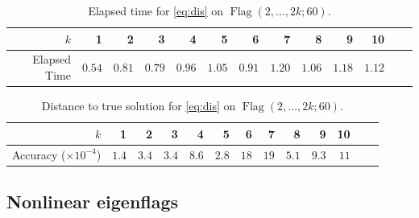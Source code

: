 \documentclass[11pt,reqno]{amsart}%
\theoremstyle{definition}
\theoremstyle{remark}
\DeclareMathOperator{\Flag}{Flag}
\begin{document}
\begin{table}[ht]
\renewcommand{\arraystretch}{1.3}
	\centering
	\begin{tabular}{r|rrrrrrrrrrrr}
		$k$ & 1 & 2 & 3 & 4 & 5 & 6 & 7 & 8 & 9 & 10\\
		\hline\hline
		Elapsed Time & $0.54$ & $0.81$ & $0.79$ & $0.96$ & $1.05$ & $0.91$ & $1.20$ & $1.06$ & $1.18$ & $1.12$\\ 
	\end{tabular} 
\vspace{1ex}
	\caption{Elapsed time for \eqref{eq:dis} on $\Flag(2,\dots,2k;60)$.}
	\label{table:timedis2}
\vspace{-4ex}
\end{table}

\begin{table}[ht]
\renewcommand{\arraystretch}{1.3}
	\centering
	\begin{tabular}{r|rrrrrrrrrrrr}
		$k$ & 1 & 2 & 3 & 4 & 5 & 6 & 7 & 8 & 9 & 10\\
		\hline\hline
		Accuracy ($\times 10^{-4}$) & $1.4$ & $3.4$ & $3.4$ & $8.6$ & $2.8$ & $18$ & $19$ & $5.1$ & $9.3$ & $11$\\ 
	\end{tabular} 
\vspace{1ex}
	\caption{Distance to true solution for \eqref{eq:dis} on $\Flag(2,\dots,2k;60)$.}
	\label{table:distdis3}
\vspace{-4ex}
\end{table}

\subsection{Nonlinear eigenflags}\label{sec:disv}
\end{document}
